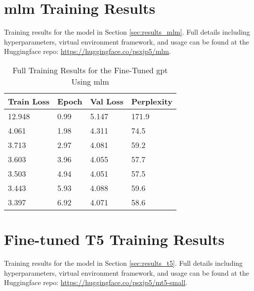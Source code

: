 \begin{appendices}


\chapter{\acrshort{mlm} Training Results}\label{ch:appendixA} %
Training results for the model in Section \ref{sec:results_mlm}. Full details including hyperparameters, virtual environment framework, and usage can be found at the Huggingface repo: \url{https://huggingface.co/psxjp5/mlm}.

\begin{table}[!ht]
\begin{adjustwidth}{-1.8cm}{}
  \centering
\begin{tabular}{l|l|l|l}
        \textbf{Train Loss} & \textbf{Epoch} & \textbf{Val Loss} & \textbf{Perplexity} \\ \hline
        12.948 & 0.99 & 5.147 & 171.9 \\ \hline
        4.061 & 1.98 & 4.311 & 74.5 \\ \hline
        3.713 & 2.97 & 4.081 & 59.2 \\ \hline
        3.603 & 3.96 & 4.055 & 57.7 \\ \hline
        3.503 & 4.94 & 4.051 & 57.5 \\ \hline
        3.443 & 5.93 & 4.088 & 59.6 \\ \hline
        3.397 & 6.92 & 4.071 & 58.6 \\
    \end{tabular}
  \caption{Full Training Results for the Fine-Tuned \acrshort{gpt} Using \acrlong{mlm}}
  \label{tab:longheaders}
\end{adjustwidth}
\end{table}

\chapter{Fine-tuned T5 Training Results}\label{ch:appendixB} %
Training results for the model in Section \ref{sec:results_t5}. Full details including hyperparameters, virtual environment framework, and usage can be found at the Huggingface repo: \url{https://huggingface.co/psxjp5/mt5-small}.


\end{appendices}
